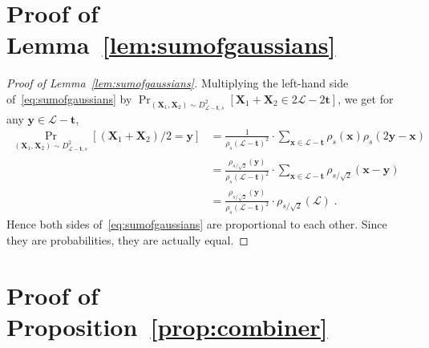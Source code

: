 \documentclass[11pt]{article}
\renewcommand{\vec}[1]{\ensuremath{\mathbf{#1}}}
\newcommand{\lat}{\mathcal{L}}
\begin{document}
\appendix
\section{Proof of Lemma~\ref{lem:sumofgaussians}}

\begin{proof}[Proof of Lemma~\ref{lem:sumofgaussians}]
Multiplying the left-hand side of~\eqref{eq:sumofgaussians} by 
$\Pr_{(\vec{X}_1, \vec{X}_2) \sim D_{\lat-\vec{t}, s}^2}[\vec{X}_1 + \vec{X}_2 \in 2\lat - 2 \vec{t}]$, 
we get for any $\vec{y} \in \lat - \vec{t}$,
\begin{align*}
\Pr_{(\vec{X}_1, \vec{X}_2) \sim D_{\lat-\vec{t}, s}^2}[(\vec{X}_1 + \vec{X}_2)/2 = \vec{y}]  
&= \frac{1}{\rho_s(\lat-\vec{t})^2}\cdot\sum_{\vec{x} \in \lat-\vec{t}} \rho_s(\vec{x}) \rho_s(2\vec{y} - \vec{x})\\
&= \frac{\rho_{s/\sqrt{2}}(\vec{y})}{\rho_s(\lat-\vec{t})^2}\cdot\sum_{\vec{x} \in \lat-\vec{t}} \rho_{s/\sqrt{2}}(\vec{x} - \vec{y})\\
&= \frac{\rho_{s/\sqrt{2}}(\vec{y})}{\rho_s(\lat-\vec{t})^2}\cdot \rho_{s/\sqrt{2}}(\lat) \; . 
\end{align*}
Hence both sides of~\eqref{eq:sumofgaussians} are proportional to each other. Since they are probabilities, they are actually equal.
\end{proof}


\section{Proof of Proposition~\ref{prop:combiner}}
\end{document}
